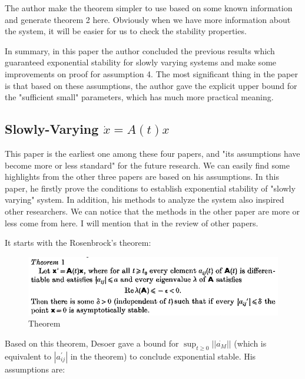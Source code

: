 \documentclass{article}
\begin{document}
The author make the theorem simpler to use based on some known information and generate theorem 2 here. Obviously when we have more information about the system, it will be easier for us to check the stability properties. 

In summary, in this paper the author concluded the previous results which  guaranteed exponential stability for slowly varying systems and make some improvements on proof for assumption 4. The most significant thing in the paper is that based on these assumptions, the author gave the explicit upper bound for the "sufficient small" parameters, which has much more practical meaning.

\subsection{Slowly-Varying $\dot{x} = A(t)x$\cite{desoer1969slowly}}
This paper is the earliest one among these four papers, and "its assumptions have become more or less standard" for the future research. We can easily find some highlights from the other three papers are based on his assumptions. In this paper, he firstly prove the conditions to establish exponential stability of "slowly varying" system. In addition, his methods to analyze the system also inspired other researchers. We can notice that the methods in the other paper are more or less come from here. I will mention that in the review of other papers.

It starts with the Rosenbrock's theorem:\\
\begin{figure}[H]
\centering
\includegraphics[width=0.7\linewidth]{Ref_3_Theorem_1.png}
\caption{Theorem}
\end{figure}

Based on this theorem, Desoer gave a bound for $\sup_{t \ge 0} ||\dot{a_M}||$ (which is equivalent to $|a_{i j}^{'}|$ in the theorem) to conclude exponential stable. His assumptions are:
\end{document}
